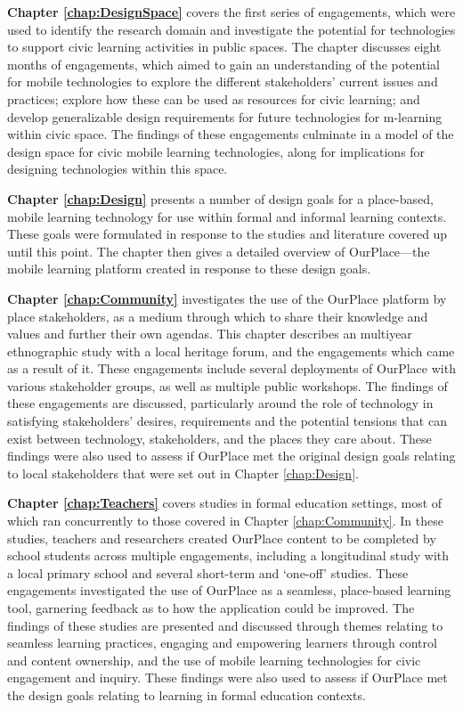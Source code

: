 \textbf{Chapter \ref{chap:DesignSpace}} covers the first series of engagements, which were used to identify the research domain and investigate the potential for technologies to support civic learning activities in public spaces. The chapter discusses eight months of engagements, which aimed to gain an understanding of the potential for mobile technologies to explore the different stakeholders’ current issues and practices; explore how these can be used as resources for civic learning; and develop generalizable design requirements for future technologies for m-learning within civic space. The findings of these engagements culminate in a model of the design space for civic mobile learning technologies, along for implications for designing technologies within this space.

\textbf{Chapter \ref{chap:Design}} presents a number of design goals for a place-based, mobile learning technology for use within formal and informal learning contexts. These goals were formulated in response to the studies and literature covered up until this point. The chapter then gives a detailed overview of OurPlace---the mobile learning platform created in response to these design goals.

\textbf{Chapter \ref{chap:Community}} investigates the use of the OurPlace platform by place stakeholders, as a medium through which to share their knowledge and values and further their own agendas. This chapter describes an multiyear ethnographic study with a local heritage forum, and the engagements which came as a result of it. These engagements include several deployments of OurPlace with various stakeholder groups, as well as multiple public workshops. The findings of these engagements are discussed, particularly around the role of technology in satisfying stakeholders' desires, requirements and the potential tensions that can exist between technology, stakeholders, and the places they care about. These findings were also used to assess if OurPlace met the original design goals relating to local stakeholders that were set out in Chapter \ref{chap:Design}.

\textbf{Chapter \ref{chap:Teachers}} covers studies in formal education settings, most of which ran concurrently to those covered in Chapter \ref{chap:Community}. In these studies, teachers and researchers created OurPlace content to be completed by school students across multiple engagements, including a longitudinal study with a local primary school and several short-term and `one-off' studies. These engagements investigated the use of OurPlace as a seamless, place-based learning tool, garnering feedback as to how the application could be improved. The findings of these studies are presented and discussed through themes relating to seamless learning practices, engaging and empowering learners through control and content ownership, and the use of mobile learning technologies for civic engagement and inquiry. These findings were also used to assess if OurPlace met the design goals relating to learning in formal education contexts.

